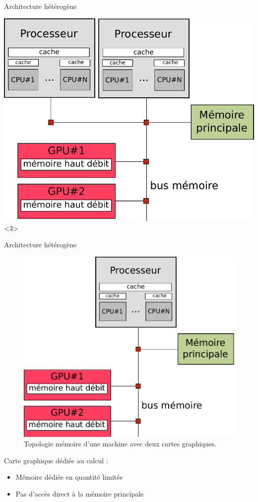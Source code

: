 \documentclass[9pt]{beamer}
\begin{document}
\begin{frame}{Architecture hétérogène}
\begin{minipage}{0.50\textwidth}
    \includegraphics[width=1\linewidth]{img/arch-3.pdf}<3>
  \end{minipage} \hfill
\end{frame}

\begin{frame}{Architecture hétérogène}
  \begin{figure}
    \centering
    \includegraphics[width=0.5\linewidth]{img/arch-4.pdf}
    \caption{Topologie mémoire d'une machine avec deux cartes graphiques.}
  \end{figure}
  \vfill
  Carte graphique dédiée au calcul :
  \vfill
  \begin{itemize}
  \item<2-> Mémoire dédiée en quantité limitée
    \vfill
  \item<3-> Pas d'accès direct à la mémoire principale
  \end{itemize}
\end{frame}
\end{document}
